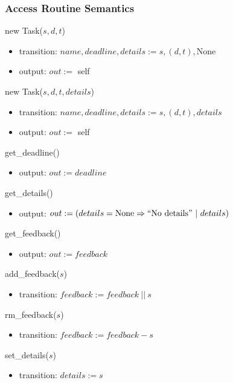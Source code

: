 \documentclass[12pt, titlepage]{article}
\begin{document}
\subsubsection*{Access Routine Semantics}
\noindent new Task($s, d, t$)
\begin{itemize}
    \item transition: $name, deadline, details := s, (d, t), \text{None}$
    \item output: $out :=$ self
\end{itemize}

\noindent new Task($s, d, t, details$)
\begin{itemize}
    \item transition: $name, deadline, details := s, (d, t), details$
    \item output: $out :=$ self
\end{itemize}

\noindent get\_deadline()
\begin{itemize}
    \item output: $out := deadline$
\end{itemize}

\noindent get\_details()
\begin{itemize}
    \item output: $out := (details = \text{None} \Rightarrow ``\text{No details}"\ |\ details)$
\end{itemize}

\noindent get\_feedback()
\begin{itemize}
    \item output: $out := feedback$
\end{itemize}

\noindent add\_feedback($s$)
\begin{itemize}
    \item transition: $feedback := feedback\ ||\ s$
\end{itemize}
\newpage

\noindent rm\_feedback($s$)
\begin{itemize}
    \item transition: $feedback := feedback - s$
\end{itemize}

\noindent set\_details($s$)
\begin{itemize}
    \item transition: $details := s$
\end{itemize}

\newpage
\end{document}
